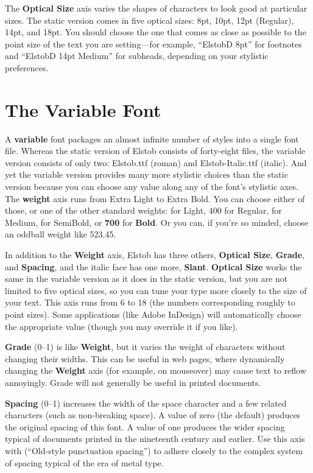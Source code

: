 \documentclass[12pt,letterpaper,openany]{book}
\begin{document}
The \textbf{Optical Size} axis varies the shapes of characters to look good at
particular sizes. The static version comes in five optical sizes: 8pt, 10pt,
12pt (Regular), 14pt, and 18pt. You should choose the one that comes as close
as possible to the point size of the text you are setting---for example, “ElstobD
8pt” for footnotes and “ElstobD 14pt Medium” for subheads, depending on your
stylistic preferences.

\section{The Variable Font}

A \textbf{variable} font packages an almost infinite number
of styles into a single font file. Whereas the static version of Elstob consists
of forty-eight files, the variable version consists of only two: Elstob.ttf
(roman) and Elstob-Italic.ttf (italic). And yet the variable version provides
many more stylistic choices than the static version because you can choose any
value along any of the font’s stylistic axes. The \textbf{weight} axis
runs from { Extra Light} to { Extra Bold}. You
can choose either of those, or one of the other standard weights: {} for
{\light Light}, 400 for Regular, {} for {\medium Medium},
{} for {\semibold SemiBold}, or \textbf{700} for \textbf{Bold}.
Or you can, if you’re so minded, choose {\oddball an oddball weight like
523.45}.

In addition to the \textbf{Weight} axis, Elstob has three others, \textbf{Optical
Size}, \textbf{Grade}, and \textbf{Spacing}, and the italic face has one more, \textbf{Slant}.
\textbf{Optical Size} works the same in the variable version as it does in the
static version, but you are not limited to five optical sizes, so you can tune
your type more closely to the size of your text. This axis runs from 6 to
18 (the numbers corresponding roughly to point sizes). Some applications (like
Adobe InDesign) will automatically
choose the appropriate value (though you may override it if you like).

\textbf{Grade}
(0--1) is like \textbf{Weight}, but it varies the weight of characters without changing
their widths. This can be useful in web pages, where dynamically changing the
\textbf{Weight} axis (for example, on mouseover) may cause text to reflow annoyingly. Grade will
not generally be useful in printed documents.

\textbf{Spacing} (0--1) increases the width of the space character and a few
related characters (such as non-breaking space). A value of zero (the default)
produces the original spacing of this font. A value of one produces the wider
spacing typical of documents printed in the nineteenth century and earlier.
Use this axis with  (“Old-style punctuation spacing”) to adhere closely to
the complex system of spacing typical of the era of metal type.
\end{document}
